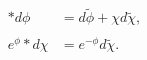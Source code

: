\begin{equation}
\begin{aligned}
\ast d\phi &=d\widetilde{\phi }+\chi d\widetilde{\chi },\\
\\
e^{\phi }\ast d\chi &=e^{-\phi }d\widetilde{\chi }.
\end{aligned}
\end{equation}

